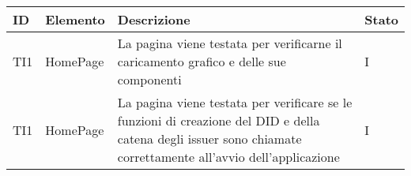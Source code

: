 \begin{center}
\label{tab:test-integrazione}
\begin{longtable}{|C{2.0cm}|C{3.0cm}|C{8.0cm}|C{2.0cm}|}
\hline
\textbf{ID} & \textbf{Elemento} & \textbf{Descrizione} & \textbf{Stato} \\
\hline
TI1 & HomePage & La pagina viene testata per verificarne il caricamento grafico e delle sue componenti & I \\
\hline
TI1 & HomePage & La pagina viene testata per verificare se le funzioni di creazione del DID e della catena degli issuer sono chiamate correttamente all'avvio dell'applicazione & I \\
\hline
\end{longtable}
\end{center}

\clearpage

